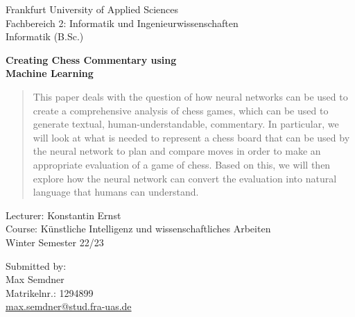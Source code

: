 \begin{titlepage}
\begin{flushleft}
Frankfurt University of Applied Sciences\\
Fachbereich 2: Informatik und Ingenieurwissenschaften\\
Informatik (B.Sc.)\\
\end{flushleft}

\vspace{3.5cm}

\begin{center}
\Large
\textbf{Creating Chess Commentary using\\Machine Learning}\\
\end{center}

\begin{abstract}
This paper deals with the question of how neural networks can be used to create a comprehensive analysis of chess games, which can be used to generate textual, human-understandable, commentary. In particular, we will look at what is needed to represent a chess board that can be used by the neural network to plan and compare moves in order to make an appropriate evaluation of a game of chess. Based on this, we will then explore how the neural network can convert the evaluation into natural language that humans can understand.
\end{abstract}

\vspace{6cm}
	
\begin{flushright}
Lecturer: Konstantin Ernst\\
Course: Künstliche Intelligenz und wissenschaftliches Arbeiten\\
Winter Semester 22/23\\
\end{flushright}

\vspace{2cm}

\begin{flushleft}
Submitted by:\\
Max Semdner\\
Matrikelnr.: 1294899\\
\href{mailto: max.semdner@stud.fra-uas.de}{max.semdner@stud.fra-uas.de}\\
\end{flushleft}

\end{titlepage}